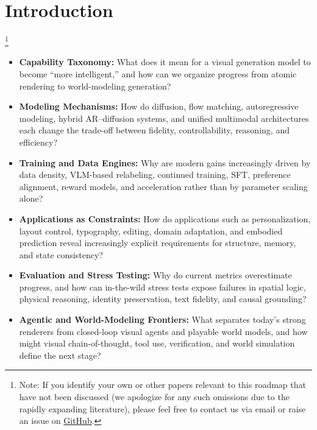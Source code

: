 \documentclass{llmxive}
\providecommand{\blfootnote}[1]{\footnote{#1}}
\begin{document}
\section{Introduction}
\label{sec:introduction}

\blfootnote{Note: If you identify your own or other papers relevant to this roadmap that have not been discussed (we apologize for any such omissions due to the rapidly expanding literature), please feel free to contact us via email or raise an issue on \href{https://github.com/EvolvingLMMs-Lab/Awesome-New-Era-Visual-Gen}{GitHub}.}

\vspace{0.6em}
\begin{tcolorbox}[
  colback=selfevolagent_light!20,
  colframe=selfevolagent_light!80,
  colbacktitle=selfevolagent_light!80,
  coltitle=black,
  title={\bfseries\fontfamily{ppl}\selectfont{Key Questions}},
  boxrule=2pt,
  arc=5pt,
  drop shadow,
  parbox=false,
  before skip=5pt,
  after skip=5pt,
  left=5pt,
  right=5pt,
]
\begin{itemize}[leftmargin=*]

\item[] \textbf{Capability Taxonomy:}
What does it mean for a visual generation model to become ``more intelligent,'' and how can we organize progress from atomic rendering to world-modeling generation?

\item[] \textbf{Modeling Mechanisms:}
How do diffusion, flow matching, autoregressive modeling, hybrid AR--diffusion systems, and unified multimodal architectures each change the trade-off between fidelity, controllability, reasoning, and efficiency?

\item[] \textbf{Training and Data Engines:}
Why are modern gains increasingly driven by data density, VLM-based relabeling, continued training, SFT, preference alignment, reward models, and acceleration rather than by parameter scaling alone?

\item[] \textbf{Applications as Constraints:}
How do applications such as personalization, layout control, typography, editing, domain adaptation, and embodied prediction reveal increasingly explicit requirements for structure, memory, and state consistency?

\item[] \textbf{Evaluation and Stress Testing:}
Why do current metrics overestimate progress, and how can in-the-wild stress tests expose failures in spatial logic, physical reasoning, identity preservation, text fidelity, and causal grounding?

\item[] \textbf{Agentic and World-Modeling Frontiers:}
What separates today’s strong renderers from closed-loop visual agents and playable world models, and how might visual chain-of-thought, tool use, verification, and world simulation define the next stage?


\end{itemize}
\end{tcolorbox}
\end{document}
